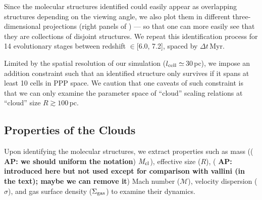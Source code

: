 \IfFileExists{emulateapjlegacy.cls}{\documentclass[iop]{emulateapjlegacy}}{\documentclass[iop]{emulateapj}}
\newcommand{\AP}[1]{({\bf \color{apcolor} AP: #1})}
\begin{document}
Since the molecular structures identified could easily appear as overlapping structures depending on the viewing angle, we also plot them in different three-dimensional projections (right panels of ) --- so that one can more easily see that they are collections of disjoint structures.
%
We repeat this identification process for 14 evolutionary stages between redshift \z$\in$[6.0, 7.2], spaced by $\Delta t$\,Myr.

Limited by the spatial resolution of our simulation ($l_{\rm cell}\simeq$\,30\,pc), we impose an addition constraint such that an identified structure only survives if it spans at least 10 cells in PPP space. We caution that one caveats of such constraint is that we can only examine the parameter space of ``cloud'' scaling relations at ``cloud'' size $R\gtrsim100$\,pc.

\subsection{Properties of the Clouds}

Upon identifying the molecular structures, we extract properties such as mass (\AP{we should uniform the notation} $M_{\rm cl}$), effective size ($R$), \AP{introduced here but not used except for comparison with vallini (in the text); maybe we can remove it} Mach number ($\mathcal{M}$), velocity dispersion ($\sigma$), and gas surface density ($\Sigma_{\rm gas}$) to examine their dynamics.
\end{document}
